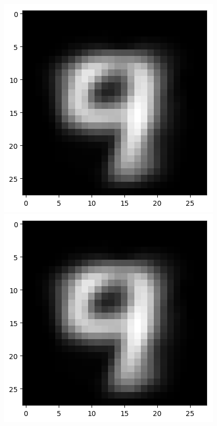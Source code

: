 \documentclass[submit]{harvardml}
\begin{document}
\begin{enumerate}
        \includegraphics[scale=0.3]{figures/k3_centroids/6.png} \\
        \includegraphics[scale=0.3]{figures/k3_centroids/6.png} \\

\end{enumerate}
\end{document}
